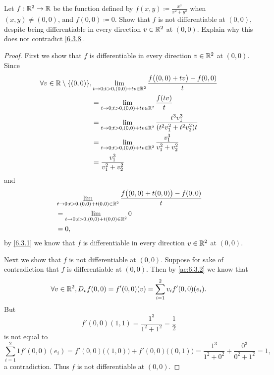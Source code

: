 \begin{ex}\label{ex:6.3.3}
  Let \(f : \mathbb{R}^2 \to \mathbb{R}\) be the function defined by \(f(x, y) \coloneqq \frac{x^3}{x^2 + y^2}\) when \((x, y) \neq (0, 0)\), and \(f(0, 0) \coloneqq 0\).
  Show that \(f\) is not differentiable at \((0, 0)\), despite being differentiable in every direction \(v \in \mathbb{R}^2\) at \((0, 0)\).
  Explain why this does not contradict \cref{6.3.8}.
\end{ex}

\begin{proof}
  First we show that \(f\) is differentiable in every direction \(v \in \mathbb{R}^2\) at \((0, 0)\).
  Since
  \begin{align*}
    \forall v \in \mathbb{R} \setminus \{(0, 0)\}, & \lim_{t \to 0 ; t > 0, (0, 0) + tv \in \mathbb{R}^2} \frac{f\big((0, 0) + tv\big) - f(0, 0)}{t}    \\
                                           & = \lim_{t \to 0 ; t > 0, (0, 0) + tv \in \mathbb{R}^2} \frac{f(tv)}{t}                             \\
                                           & = \lim_{t \to 0 ; t > 0, (0, 0) + tv \in \mathbb{R}^2} \frac{t^3 v_1^3}{(t^2 v_1^2 + t^2 v_2^2) t} \\
                                           & = \lim_{t \to 0 ; t > 0, (0, 0) + tv \in \mathbb{R}^2} \frac{v_1^3}{v_1^2 + v_2^2}                 \\
                                           & = \frac{v_1^3}{v_1^2 + v_2^2}
  \end{align*}
  and
  \begin{align*}
     & \lim_{t \to 0 ; t > 0, (0, 0) + t (0, 0) \in \mathbb{R}^2} \frac{f\big((0, 0) + t(0, 0)\big) - f(0, 0)}{t} \\
     & = \lim_{t \to 0 ; t > 0, (0, 0) + t (0, 0) \in \mathbb{R}^2} 0                                             \\
     & = 0,
  \end{align*}
  by \cref{6.3.1} we know that \(f\) is differentiable in every direction \(v \in \mathbb{R}^2\) at \((0, 0)\).

  Next we show that \(f\) is not differentiable at \((0, 0)\).
  Suppose for sake of contradiction that \(f\) is differentiable at \((0, 0)\).
  Then by \cref{ac:6.3.2} we know that
  \[
    \forall v \in \mathbb{R}^2, D_v f(0, 0) = f'(0, 0)(v) = \sum_{i = 1}^2 v_i f'(0, 0)(e_i).
  \]
  But
  \[
    f'(0, 0)(1, 1) = \frac{1^3}{1^2 + 1^2} = \frac{1}{2}
  \]
  is not equal to
  \[
    \sum_{i = 1}^2 1 f'(0, 0)(e_i) = f'(0, 0)\big((1, 0)\big) + f'(0, 0)\big((0, 1)\big) = \frac{1^3}{1^2 + 0^2} + \frac{0^3}{0^2 + 1^2} = 1,
  \]
  a contradiction.
  Thus \(f\) is not differentiable at \((0, 0)\).


\end{proof}
